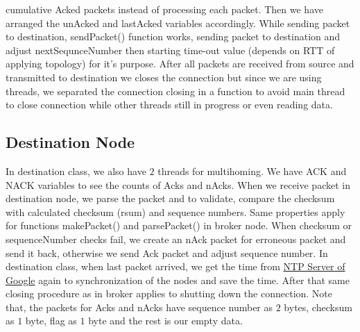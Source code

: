 cumulative Acked packets instead of processing each packet. Then we have arranged the unAcked and lastAcked variables accordingly. While sending packet to destination, sendPacket() function works, sending packet to destination and adjust nextSequnceNumber then starting time-out value (depends on RTT of applying topology) for it's purpose. After all packets are received from source and transmitted to destination we closes the connection but since we are using threads, we separated the connection closing in a function to avoid main thread to close connection while other threads still in progress or even reading data.
\subsection{Destination Node}
In destination class, we also have $2$ threads for multihoming. We have ACK and NACK variables to see the counts of Acks and nAcks. When we receive packet in destination node, we parse the packet and to validate, compare the checksum with calculated checksum (rsum) and sequence numbers. Same properties apply for functions makePacket() and parsePacket() in broker node. When checksum or sequenceNumber checks fail, we create an nAck packet for erroneous packet and send it back, otherwise we send Ack packet and adjust sequence number. In destination class, when last packet arrived, we get the time from \href{https://developers.google.com/time/}{NTP Server of Google} again to synchronization of the nodes and save the time. After that same closing procedure as in broker applies to shutting down the connection. Note that, the packets for Acks and nAcks have sequence number as $2$ bytes, checksum as $1$ byte, flag as $1$ byte and the rest is our empty data.
\newpage
